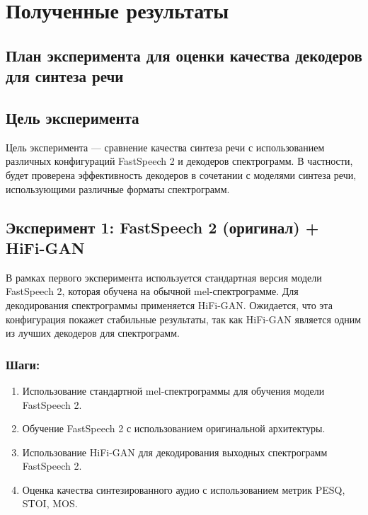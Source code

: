 \chapter{Полученные результаты}














\section{План эксперимента для оценки качества декодеров для синтеза речи}

\section{Цель эксперимента}

Цель эксперимента — сравнение качества синтеза речи с использованием различных конфигураций FastSpeech 2 и декодеров спектрограмм. В частности, будет проверена эффективность декодеров в сочетании с моделями синтеза речи, использующими различные форматы спектрограмм.

\section{Эксперимент 1: FastSpeech 2 (оригинал) + HiFi-GAN}

В рамках первого эксперимента используется стандартная версия модели FastSpeech 2, которая обучена на обычной mel-спектрограмме. Для декодирования спектрограммы применяется HiFi-GAN. Ожидается, что эта конфигурация покажет стабильные результаты, так как HiFi-GAN является одним из лучших декодеров для спектрограмм.

\subsection{Шаги:}
\begin{enumerate}
    \item Использование стандартной mel-спектрограммы для обучения модели FastSpeech 2.
    \item Обучение FastSpeech 2 с использованием оригинальной архитектуры.
    \item Использование HiFi-GAN для декодирования выходных спектрограмм FastSpeech 2.
    \item Оценка качества синтезированного аудио с использованием метрик PESQ, STOI, MOS.
\end{enumerate}


